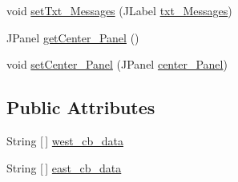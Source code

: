 \begin{DoxyCompactItemize}
\item 
void \mbox{\hyperlink{classcom_1_1_b_n_u_1_1pages_1_1main_1_1_main_model_a7aa123fe209be9a2d0031b57cb948aad}{set\+Txt\+\_\+\+Messages}} (J\+Label \mbox{\hyperlink{classcom_1_1_b_n_u_1_1pages_1_1main_1_1_main_model_a21950f3aa82612e6592b7ce9655d9a76}{txt\+\_\+\+Messages}})
\item 
J\+Panel \mbox{\hyperlink{classcom_1_1_b_n_u_1_1pages_1_1main_1_1_main_model_ae6b355b6742b2f6ffc641e9a6e9ef5b2}{get\+Center\+\_\+\+Panel}} ()
\item 
void \mbox{\hyperlink{classcom_1_1_b_n_u_1_1pages_1_1main_1_1_main_model_a707a29a48d5ea0bc08b7c12ac18536ab}{set\+Center\+\_\+\+Panel}} (J\+Panel \mbox{\hyperlink{classcom_1_1_b_n_u_1_1pages_1_1main_1_1_main_model_a834146f50854e68faf7e7e4918dfb4f3}{center\+\_\+\+Panel}})
\end{DoxyCompactItemize}
\subsection*{Public Attributes}
\begin{DoxyCompactItemize}
\item 
String \mbox{[}$\,$\mbox{]} \mbox{\hyperlink{classcom_1_1_b_n_u_1_1pages_1_1main_1_1_main_model_af046f56b1a6221ed312ecadc6b5d7b0b}{west\+\_\+cb\+\_\+data}}
\item 
String \mbox{[}$\,$\mbox{]} \mbox{\hyperlink{classcom_1_1_b_n_u_1_1pages_1_1main_1_1_main_model_afd1d25b0c011cbf82cdb52420d59e189}{east\+\_\+cb\+\_\+data}}
\end{DoxyCompactItemize}
